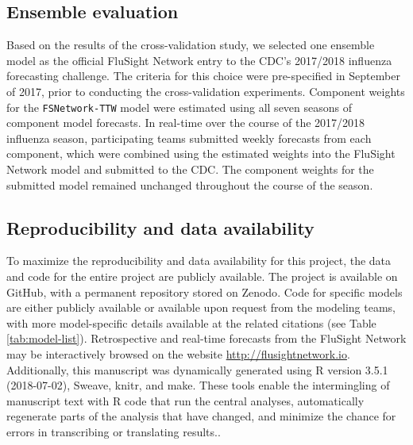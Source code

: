 \documentclass{article}\usepackage[]{graphicx}\usepackage[]{color}
\begin{document}
\subsection{Ensemble evaluation}

Based on the results of the cross-validation study, we selected one ensemble model as the official FluSight Network entry to the CDC's 2017/2018 influenza forecasting challenge.
The criteria for this choice were pre-specified in September of 2017, prior to conducting the cross-validation experiments.\cite{Reich2017github} 
Component weights for the {\tt FSNetwork-TTW} model were estimated using all seven seasons of component model forecasts. In real-time over the course of the 2017/2018 influenza season, participating teams submitted weekly forecasts from each component, which were combined using the estimated weights into the FluSight Network model and submitted to the CDC. The component weights for the submitted model remained unchanged throughout the course of the season.

\subsection{Reproducibility and data availability}

To maximize the reproducibility and data availability for this project, the data and code for the entire project are publicly available.
The project is available on GitHub\cite{fsngithub2018}, with a permanent repository stored on Zenodo\cite{fsnzenodo2018}.
Code for specific models are either publicly available or available upon request from the modeling teams, with more model-specific details available at the related citations (see Table \ref{tab:model-list}).
Retrospective and real-time forecasts from the FluSight Network may be interactively browsed on the website \url{http://flusightnetwork.io}.
Additionally, this manuscript was dynamically generated using R version 3.5.1 (2018-07-02), Sweave, knitr, and make.
These tools enable the intermingling of manuscript text with R code that run the central analyses, automatically regenerate parts of the analysis that have changed, and minimize the chance for errors in transcribing or translating results.\cite{Xie2015,RCore2017}.




\end{document}
